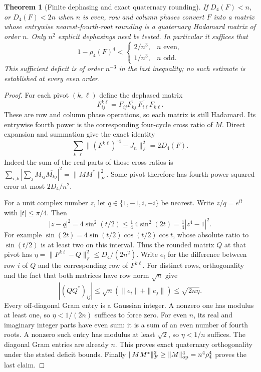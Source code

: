 \documentclass[11pt]{article}
\newtheorem{theorem}{Theorem}[section]
\begin{document}
\begin{theorem}[Finite dephasing and exact quaternary rounding]
\label{thm:phase-rounding}
If $D_4(F)<n$, or $D_4(F)<2n$ when $n$ is even,
row and column phases convert $F$ into
a matrix whose entrywise nearest-fourth-root rounding is a
quaternary Hadamard matrix of order $n$.
Only $n^2$ explicit dephasings need be tested.
In particular it suffices that
\[
 1-\rho_4(F)^4<
 \begin{cases}2/n^3,& n\text{ even},\\1/n^3,&n\text{ odd}.\end{cases}
\]
This sufficient deficit is of order $n^{-3}$ in the last inequality;
no such estimate is established at every even order.
\end{theorem}
\begin{proof}
For each pivot $(k,\ell)$ define the dephased matrix
\[
 F^{k\ell}_{ij}
 =F_{ij}\overline{F_{kj}}\,
       \overline{F_{i\ell}}F_{k\ell}.
\]
These are row and column phase operations, so each matrix is still
Hadamard. Its entrywise fourth power is the corresponding four-cycle
cross ratio of $M$. Direct expansion and summation give the exact identity
\[
 \sum_{k,\ell}\|(F^{k\ell})^{\circ4}-J_n\|_F^2=2D_4(F).
\]
Indeed the sum of the real parts of those cross ratios is
$\sum_{i,k}|\sum_j M_{ij}\overline{M_{kj}}|^2=\|MM^*\|_F^2$.
Some pivot therefore has fourth-power squared error at most
$2D_4/n^2$.

For a unit complex number $z$, let $q\in\{1,-1,i,-i\}$ be nearest.
Write $z/q=e^{it}$ with $|t|\le\pi/4$. Then
\[
 |z-q|^2=4\sin^2(t/2)\le
 \tfrac14\,4\sin^2(2t)=\tfrac14|z^4-1|^2.
\]
For example $\sin(2t)=4\sin(t/2)\cos(t/2)\cos t$, whose absolute
ratio to $\sin(t/2)$ is at least two on this interval.
Thus the rounded matrix $Q$ at that pivot has
$\eta=\|F^{k\ell}-Q\|_F^2\le D_4/(2n^2)$.
Write $e_i$ for the difference between row $i$ of $Q$ and the
corresponding row of $F^{k\ell}$. For distinct rows, orthogonality
and the fact that both matrices have row norm $\sqrt n$ give
\[
 |(QQ^*)_{ij}|
 \le\sqrt n(\|e_i\|+\|e_j\|)
 \le\sqrt{2n\eta}.
\]
Every off-diagonal Gram entry is a Gaussian integer. A nonzero one
has modulus at least one, so $\eta<1/(2n)$ suffices to force zero.
For even $n$, its real and imaginary integer parts have even sum:
it is a sum of an even number of fourth roots. A nonzero such entry
has modulus at least $\sqrt2$, so $\eta<1/n$ suffices.
The diagonal Gram entries are already $n$. This proves exact
quaternary orthogonality under the stated deficit bounds. Finally
$\|MM^*\|_F^2\ge\|M\|_{\rm op}^4=n^4\rho_4^4$ proves the last claim.
\end{proof}
\end{document}
